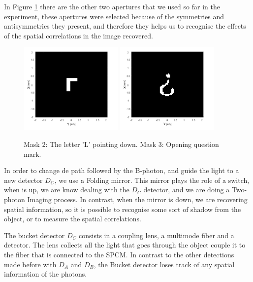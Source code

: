 In Figure \ref{fig:masks} there are the other two apertures that we used so far in the 
experiment, 
these apertures were selected because of the symmetries and antisymmetries they present, 
and therefore
they helps us to recognise the effects  of the spatial correlations in the image
recovered.  

\begin{figure}[h!]
\centering
{  \includegraphics[width=0.45\textwidth]{Figures/mask2.png} }
{  \includegraphics[width=0.45\textwidth]{Figures/mask3.png} }
\caption{Mask 2: The letter 'L' pointing down. Mask 3: Opening question mark.}
 \label{fig:masks}
\end{figure}


In order to change de path followed by the B-photon, and guide the light to a new detector $D_C$, we use a Folding mirror.
This mirror plays the role of a switch, when is up, we are know dealing with the
$D_C$ detector, and we are doing a Two-photon Imaging process. In contrast, when the mirror is 
down, we are recovering spatial information, so it is possible to recognise some sort of
shadow from the object, or to measure the spatial correlations.



The bucket detector $D_C$ consists in a coupling lens, a multimode fiber and a detector. The lens collects all the 
light that goes 
through the object couple it to the fiber that is connected to the SPCM. In contrast to the other detections made 
before with $D_A$ and $D_B$, the Bucket detector loses track of any spatial information of the photons. 
